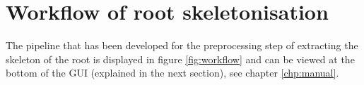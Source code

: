%
%
%


\section{Workflow of root skeletonisation}

The pipeline that has been developed for the preprocessing step of extracting the skeleton of the root is displayed in figure \ref{fig:workflow} and can be viewed at the bottom of the GUI (explained in the next section), see chapter \ref{chp:manual}.

